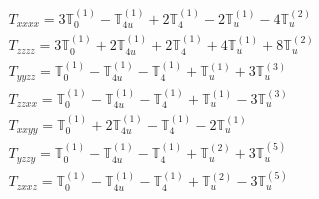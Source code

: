 \documentclass[fleqn,8pt,landscape]{jsarticle}
\begin{document}
\begin{align*}
& T_{xxxx} = 3 \mathbb{T}_{0}^{(1)} - \mathbb{T}_{4u}^{(1)} + 2 \mathbb{T}_{4}^{(1)} - 2 \mathbb{T}_{u}^{(1)} - 4 \mathbb{T}_{u}^{(2)} \\
& T_{zzzz} = 3 \mathbb{T}_{0}^{(1)} + 2 \mathbb{T}_{4u}^{(1)} + 2 \mathbb{T}_{4}^{(1)} + 4 \mathbb{T}_{u}^{(1)} + 8 \mathbb{T}_{u}^{(2)} \\
& T_{yyzz} = \mathbb{T}_{0}^{(1)} - \mathbb{T}_{4u}^{(1)} - \mathbb{T}_{4}^{(1)} + \mathbb{T}_{u}^{(1)} + 3 \mathbb{T}_{u}^{(3)} \\
& T_{zzxx} = \mathbb{T}_{0}^{(1)} - \mathbb{T}_{4u}^{(1)} - \mathbb{T}_{4}^{(1)} + \mathbb{T}_{u}^{(1)} - 3 \mathbb{T}_{u}^{(3)} \\
& T_{xxyy} = \mathbb{T}_{0}^{(1)} + 2 \mathbb{T}_{4u}^{(1)} - \mathbb{T}_{4}^{(1)} - 2 \mathbb{T}_{u}^{(1)} \\
& T_{yzzy} = \mathbb{T}_{0}^{(1)} - \mathbb{T}_{4u}^{(1)} - \mathbb{T}_{4}^{(1)} + \mathbb{T}_{u}^{(2)} + 3 \mathbb{T}_{u}^{(5)} \\
& T_{zxxz} = \mathbb{T}_{0}^{(1)} - \mathbb{T}_{4u}^{(1)} - \mathbb{T}_{4}^{(1)} + \mathbb{T}_{u}^{(2)} - 3 \mathbb{T}_{u}^{(5)}
\end{align*}
\end{document}

